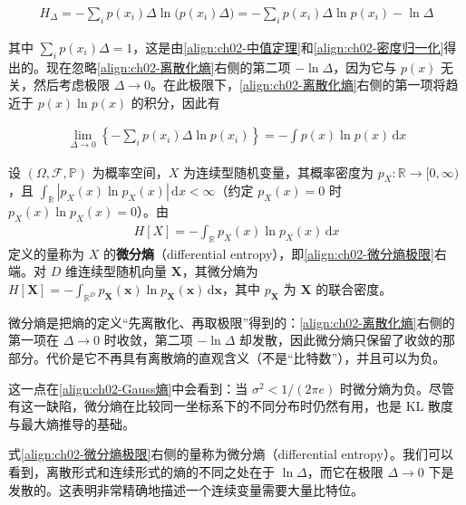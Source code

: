 \documentclass[../../main.tex]{subfiles}
\begin{document}
\begin{align}
  H_{\Delta} = -\sum_i p(x_i)\Delta\ln\big(p(x_i)\Delta\big) = -\sum_i p(x_i)\Delta\ln p(x_i) - \ln\Delta
  \label{align:ch02-离散化熵}
\end{align}

其中 $\sum_ip(x_i)\Delta=1$，这是由\eqref{align:ch02-中值定理}和\eqref{align:ch02-密度归一化}得出的。现在忽略\eqref{align:ch02-离散化熵}右侧的第二项 $-\ln\Delta$，因为它与 $p(x)$ 无关，然后考虑极限 $\Delta\to0$。在此极限下，\eqref{align:ch02-离散化熵}右侧的第一项将趋近于 $p(x)\ln p(x)$ 的积分，因此有

\begin{align}
  \lim_{\Delta\to0}\left\{-\sum_i p(x_i)\Delta\ln p(x_i)\right\} = -\int p(x)\ln p(x)\,\mathrm{d}x
  \label{align:ch02-微分熵极限}
\end{align}

\begin{definition}[微分熵]\label{definition:ch02-微分熵}
设 $(\Omega,\mathcal{F},\mathbb{P})$ 为概率空间，$X$ 为连续型随机变量，其概率密度为 $p_X:\mathbb{R}\to[0,\infty)$，且 $\int_{\mathbb{R}}|p_X(x)\ln p_X(x)|\,\mathrm{d}x<\infty$（约定 $p_X(x)=0$ 时 $p_X(x)\ln p_X(x)=0$）。由
\begin{align*}
  H[X]=-\int_{\mathbb{R}}p_X(x)\ln p_X(x)\,\mathrm{d}x
\end{align*}
定义的量称为 $X$ 的\textbf{微分熵}（differential entropy），即\eqref{align:ch02-微分熵极限}右端。对 $D$ 维连续型随机向量 $\mathbf{X}$，其微分熵为 $H[\mathbf{X}]=-\int_{\mathbb{R}^{D}}p_{\mathbf{X}}(\mathbf{x})\ln p_{\mathbf{X}}(\mathbf{x})\,\mathrm{d}\mathbf{x}$，其中 $p_{\mathbf{X}}$ 为 $\mathbf{X}$ 的联合密度。
\end{definition}

\begin{remark}
微分熵是把熵的定义“先离散化、再取极限”得到的：\eqref{align:ch02-离散化熵}右侧的第一项在 $\Delta\to0$ 时收敛，第二项 $-\ln\Delta$ 却发散，因此微分熵只保留了收敛的那部分。代价是它不再具有离散熵的直观含义（不是“比特数”），并且可以为负。

这一点在\eqref{align:ch02-Gauss熵}中会看到：当 $\sigma^{2}<1/(2\pi e)$ 时微分熵为负。尽管有这一缺陷，微分熵在比较同一坐标系下的不同分布时仍然有用，也是 KL 散度与最大熵推导的基础。
\end{remark}

式\eqref{align:ch02-微分熵极限}右侧的量称为微分熵（differential entropy）。我们可以看到，离散形式和连续形式的熵的不同之处在于 $\ln\Delta$，而它在极限 $\Delta\to0$ 下是发散的。这表明非常精确地描述一个连续变量需要大量比特位。
\end{document}
